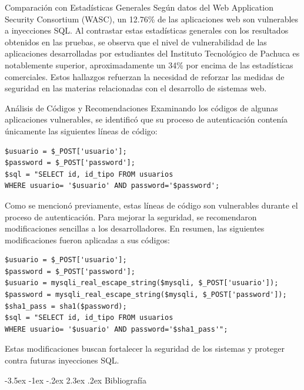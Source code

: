 \documentclass[11pt]{report}
\makeatletter
\renewcommand\chapter{\@startsection{chapter}{0}{\z@}%
    {-3.5ex \@plus -1ex \@minus -.2ex}%
    {2.3ex \@plus.2ex}%
    {\normalfont\Large\bfseries}}
\makeatother
\begin{document}
Comparación con Estadísticas Generales Según datos del Web Application Security Consortium (WASC), un 12.76\% de las aplicaciones web son vulnerables a inyecciones SQL. 
Al contrastar estas estadísticas generales con los resultados obtenidos en las pruebas, se observa que el nivel de vulnerabilidad de las aplicaciones desarrolladas por 
estudiantes del Instituto Tecnológico de Pachuca es notablemente superior, aproximadamente un 34\% por encima de las estadísticas comerciales. Estos hallazgos refuerzan 
la necesidad de reforzar las medidas de seguridad en las materias relacionadas con el desarrollo de sistemas web.

\cleardoublepage

Análisis de Códigos y Recomendaciones Examinando los códigos de algunas aplicaciones vulnerables, se identificó que su proceso de autenticación contenía únicamente las siguientes 
líneas de código:
\begin{verbatim}
$usuario = $_POST['usuario']; 
$password = $_POST['password'];
$sql = "SELECT id, id_tipo FROM usuarios 
WHERE usuario= '$usuario' AND password='$password';
\end{verbatim}

Como se mencionó previamente, estas líneas de código son vulnerables durante el proceso de autenticación. Para mejorar la seguridad, se recomendaron modificaciones sencillas a los desarrolladores. En resumen, las siguientes modificaciones fueron aplicadas a sus códigos:

\begin{verbatim}
$usuario = $_POST['usuario'];
$password = $_POST['password']; 
$usuario = mysqli_real_escape_string($mysqli, $_POST['usuario']); 
$password = mysqli_real_escape_string($mysqli, $_POST['password']); 
$sha1_pass = sha1($password);
$sql = "SELECT id, id_tipo FROM usuarios
WHERE usuario= '$usuario' AND password='$sha1_pass'";
\end{verbatim}

Estas modificaciones buscan fortalecer la seguridad de los sistemas y proteger contra futuras inyecciones SQL.

\cleardoublepage

\chapter{Bibliografía}
\end{document}
